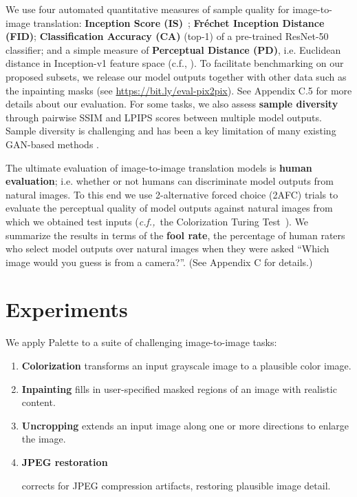 We use four automated quantitative measures of sample quality for image-to-image translation: {\bf Inception Score (IS)}~\citep{salimans-iclr-2017}; {\bf Fréchet Inception Distance (FID)}; {\bf Classification Accuracy (CA)} (top-1) of a pre-trained ResNet-50 classifier; and  a simple measure of {\bf Perceptual Distance (PD)}, i.e. Euclidean distance in Inception-v1 feature space (c.f., \cite{DosovitskiyBrox2016}). To facilitate benchmarking on our proposed subsets, we release our model outputs together with other data such as the inpainting masks (see \url{https://bit.ly/eval-pix2pix}).
See Appendix C.5 for more details about our evaluation. For some tasks, we also assess \textbf{sample diversity} through pairwise SSIM and LPIPS scores between multiple model outputs. Sample diversity is challenging and has been a key limitation of many existing GAN-based methods \citep{zhu2017multimodal, yang2019diversity}.

The ultimate evaluation of image-to-image translation models is \textbf{human evaluation}; i.e. whether or not humans can discriminate model outputs from natural images. To this end we use 2-alternative forced choice (2AFC) trials to evaluate the perceptual quality of model outputs against natural images from which we obtained test inputs ({\em c.f.,}~the Colorization Turing Test~\citep{zhang2016colorful}). We summarize the results in terms of the \textbf{fool rate}, the percentage of human raters who select model outputs over natural images when they were asked ``Which image would you guess is from a camera?''. (See Appendix C for details.)

\section{Experiments}

We apply Palette to a suite of challenging image-to-image  tasks:

\begin{enumerate}[topsep=0.1pt, partopsep=0pt, leftmargin=20pt, parsep=0pt, itemsep=0.1pt]
    \item \textbf{Colorization} transforms an input grayscale image to a plausible color image.
    \item \textbf{Inpainting} fills in user-specified masked regions of an image with realistic content. 
    \item \textbf{Uncropping} extends an input image along one or more directions to enlarge the image.
    \item \textbf{JPEG restoration} 

    corrects for JPEG compression artifacts, restoring plausible image detail.
\end{enumerate}

